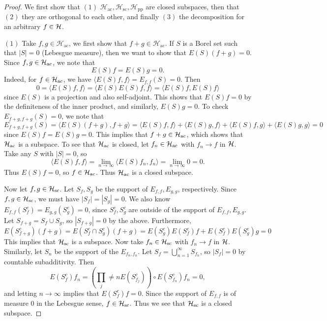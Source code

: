 \begin{proof}
  We first show that $(1)$ $\mathcal{H}_{\mathrm{ac}}, \mathcal{H}_{\mathrm{sc}}, \mathcal{H}_{\mathrm{pp}}$ are closed
  subspaces, then that $(2)$ they are orthogonal to each
  other, and finally $(3)$ the decomposition for
  an arbitrary $f \in \mathcal{H}$.

  $(1)$ Take $f, g \in \mathcal{H}_{\mathrm{ac}}$,
  we first show that $f + g \in \mathcal{H}_{\mathrm{ac}}$.
  If $S$ is a Borel set such that $|S| = 0$ (Lebesgue
  measure), then we want to show that
  $E(S)(f + g) = 0$. Since $f, g \in \mathcal{H}_{\mathrm{ac}}$, we note that
  \[
    E(S)f = E(S)g = 0.
  \]
  Indeed, for $f \in \mathcal{H}_{\mathrm{ac}}$, we have
  $\langle E(S) f, f \rangle = E_{f, f}(S) = 0$. Then
  \[
    0 = \langle E(S) f, f \rangle = \langle E(S) E(S) f, f \rangle
    = \langle E(S) f , E(S) f \rangle
  \]
  since $E(S)$ is a projection and also
  self-adjoint. This shows that $E(S)f = 0$ by the
  definiteness of the inner product, and
  similarly, $E(S) g = 0$.
  To check $E_{f + g, f + g}(S) = 0$, we note that
  \[
    E_{f + g, f + g}(S) = \langle E(S) (f + g), f + g \rangle
    = \langle E(S) f, f \rangle + \langle E(S) g, f \rangle
    + \langle E(S) f, g \rangle + \langle E(S) g, g \rangle
    = 0
  \]
  since $E(S) f = E(S) g = 0$. This implies
  that $f + g \in \mathcal{H}_{\mathrm{ac}}$, which shows that
  $\mathcal{H}_{\mathrm{ac}}$ is a subspace. To see that $\mathcal{H}_{\mathrm{ac}}$ is
  closed,
  let $f_n \in \mathcal{H}_{\mathrm{ac}}$ with $f_n \to f$ in $\mathcal{H}$.
  Take any $S$ with $|S| = 0$, so
  \[
    \langle E(S)f, f \rangle
    =
    \lim_{n \to \infty} \langle E(S) f_n, f_n \rangle =
    \lim_{n \to \infty} 0 = 0.
  \]
  Thus $E(S) f = 0$, so $f \in \mathcal{H}_{\mathrm{ac}}$. Thus
  $\mathcal{H}_{\mathrm{ac}}$ is a closed subspace.

  Now let $f, g \in \mathcal{H}_{\mathrm{sc}}$. Let $S_f, S_g$ be the support
  of $E_{f, f}, E_{g, g}$, respectively. Since
  $f, g \in \mathcal{H}_{\mathrm{sc}}$, we must have $|S_f| = |S_g| = 0$.
  We also know $E_{f, f}(S_f^c) = E_{g, g}(S_g^c) = 0$,
  since $S_f^c, S_g^c$ are outside of the support
  of $E_{f, f}, E_{g, g}$. Let
  $S_{f + g} = S_f \cup S_g$, so
  $|S_{f + g}| = 0$ by the above. Furthermore,
  \[
    E(S_{f + g}^c)(f + g)
    = E(S_f^c \cap S_g^c)(f + g)
    = E(S_g^c) E(S_f^c) f + E(S_f^c) E(S_g^c) g
    = 0
  \]
  This implies that $\mathcal{H}_{\mathrm{sc}}$ is a subspace.
  Now take $f_n \in \mathcal{H}_{\mathrm{sc}}$ with $f_n \to f$ in $\mathcal{H}$.
  Similarly, let $S_n$ be the support of the $E_{f_n, f_n}$.
  Let $S_f = \bigcup_{n = 1}^\infty S_{f_n}$, so
  $|S_f| = 0$ by countable subadditivity. Then
  \[
    E(S_f^c) f_n
    = \left(\prod_j \ne n E(S^c_{f_j})\right) \circ E(S_{f_n}^c) f_n
    = 0,
  \]
  and letting $n \to \infty$ implies that
  $E(S_f^c) f = 0$. Since the support of $E_{f, f}$ is
  of measure $0$ in the Lebesgue sense,
  $f \in \mathcal{H}_{\mathrm{sc}}$.
  Thus we see that $\mathcal{H}_{\mathrm{sc}}$ is a closed subspace.


\end{proof}
